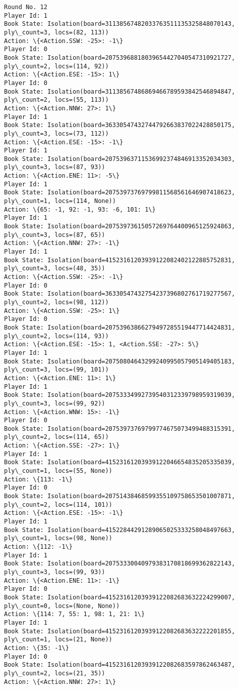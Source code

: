 \documentclass[11pt]{article}
\begin{document}
\begin{Verbatim}[commandchars=\\\{\}]
Round No. 12
Player Id: 1
Book State: Isolation(board=31138567482033763511135325848070143, ply\_count=3, locs=(82, 113))
Action: \{<Action.SSW: -25>: -1\}
Player Id: 0
Book State: Isolation(board=20753968818039654427040547310921727, ply\_count=2, locs=(114, 92))
Action: \{<Action.ESE: -15>: 1\}
Player Id: 0
Book State: Isolation(board=31138567486869466789593842546894847, ply\_count=2, locs=(55, 113))
Action: \{<Action.NNW: 27>: 1\}
Player Id: 1
Book State: Isolation(board=36330547432744792663837022428850175, ply\_count=3, locs=(73, 112))
Action: \{<Action.ESE: -15>: -1\}
Player Id: 1
Book State: Isolation(board=20753963711536992374846913352034303, ply\_count=3, locs=(87, 93))
Action: \{<Action.ENE: 11>: -5\}
Player Id: 1
Book State: Isolation(board=20753973769799811568561646907418623, ply\_count=1, locs=(114, None))
Action: \{65: -1, 92: -1, 93: -6, 101: 1\}
Player Id: 1
Book State: Isolation(board=20753973615057269764400965125924863, ply\_count=3, locs=(87, 65))
Action: \{<Action.NNW: 27>: -1\}
Player Id: 1
Book State: Isolation(board=41523161203939122082402122885752831, ply\_count=3, locs=(48, 35))
Action: \{<Action.SSW: -25>: -1\}
Player Id: 0
Book State: Isolation(board=36330547432754237396802761719277567, ply\_count=2, locs=(98, 112))
Action: \{<Action.SSW: -25>: 1\}
Player Id: 0
Book State: Isolation(board=20753963866279497285519447714424831, ply\_count=2, locs=(114, 93))
Action: \{<Action.ESE: -15>: 1, <Action.SSE: -27>: 5\}
Player Id: 1
Book State: Isolation(board=20750804643299240995057905149405183, ply\_count=3, locs=(99, 101))
Action: \{<Action.ENE: 11>: 1\}
Player Id: 1
Book State: Isolation(board=20753334992739540312339798959319039, ply\_count=3, locs=(99, 92))
Action: \{<Action.WNW: 15>: -1\}
Player Id: 0
Book State: Isolation(board=20753973769799774675073499488315391, ply\_count=2, locs=(114, 65))
Action: \{<Action.SSE: -27>: 1\}
Player Id: 1
Book State: Isolation(board=41523161203939122046654835205335039, ply\_count=1, locs=(55, None))
Action: \{113: -1\}
Player Id: 0
Book State: Isolation(board=20751438468599355109758653501007871, ply\_count=2, locs=(114, 101))
Action: \{<Action.ESE: -15>: -1\}
Player Id: 1
Book State: Isolation(board=41522844291289065025333258048497663, ply\_count=1, locs=(98, None))
Action: \{112: -1\}
Player Id: 1
Book State: Isolation(board=20753330040979383170818699362822143, ply\_count=3, locs=(99, 93))
Action: \{<Action.ENE: 11>: -1\}
Player Id: 0
Book State: Isolation(board=41523161203939122082683632224299007, ply\_count=0, locs=(None, None))
Action: \{114: 7, 55: 1, 98: 1, 21: 1\}
Player Id: 1
Book State: Isolation(board=41523161203939122082683632222201855, ply\_count=1, locs=(21, None))
Action: \{35: -1\}
Player Id: 0
Book State: Isolation(board=41523161203939122082683597862463487, ply\_count=2, locs=(21, 35))
Action: \{<Action.NNW: 27>: 1\}


\end{Verbatim}
\end{document}
